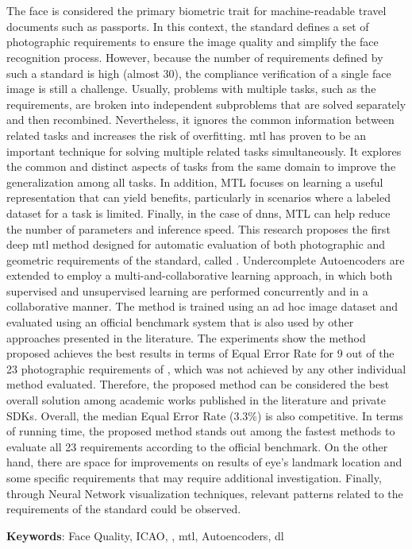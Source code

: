 \section*{}

The face is considered the primary biometric trait for machine-readable travel documents such as passports. In this context, the \icao standard defines a set of photographic requirements to ensure the image quality and simplify the face recognition process. However, because the number of requirements defined by such a standard is high (almost 30), the compliance verification of a single face image is still a challenge. Usually, problems with multiple tasks, such as the \icao requirements, are broken into independent subproblems that are solved separately and then recombined. Nevertheless, it ignores the common information between related tasks and increases the risk of overfitting. \acf{mtl} has proven to be an important technique for solving multiple related tasks simultaneously. It explores the common and distinct aspects of tasks from the same domain to improve the generalization among all tasks. In addition, MTL focuses on learning a useful representation that can yield benefits, particularly in scenarios where a labeled dataset for a task is limited. Finally, in the case of \aclp{dnn}, MTL can help reduce the number of parameters and inference speed. This research proposes the first deep \acl{mtl} method designed for automatic evaluation of both photographic and geometric requirements of the \icao standard, called \methodname. Undercomplete Autoencoders are extended to employ a multi-and-collaborative learning approach, in which both supervised and unsupervised learning are performed concurrently and in a collaborative manner. The method is trained using an ad hoc image dataset and evaluated using an official benchmark system that is also used by other approaches presented in the literature. The experiments show the method proposed achieves the best results in terms of Equal Error Rate for 9 out of the 23 photographic requirements of \icao, which was not achieved by any other individual method evaluated. Therefore, the proposed method can be considered the best overall solution among academic works published in the literature and private SDKs. Overall, the median Equal Error Rate (3.3\%) is also competitive. In terms of running time, the proposed method stands out among the fastest methods to evaluate all 23 requirements according to the official benchmark. On the other hand, there are space for improvements on results of eye's landmark location and some specific requirements that may require additional investigation. Finally, through Neural Network visualization techniques, relevant patterns related to the requirements of the \icao standard could be observed. 

\vspace{2em}

\noindent
\textbf{Keywords}: Face Quality, ICAO, \icao, \acl{mtl}, Autoencoders, \acl{dl}

\newpage
